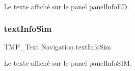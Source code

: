 Le texte affiché sur le panel panel\+Info\+ED. 

\mbox{\label{class_navigation_aefa9a0108a63c721559a2ede11fad997}} 
\subsubsection{\texorpdfstring{text\+Info\+Sim}{textInfoSim}}
{\footnotesize\ttfamily T\+M\+P\+\_\+\+Text Navigation.\+text\+Info\+Sim\hspace{0.3cm}{\ttfamily [private]}}



Le texte affiché sur le panel panel\+Info\+S\+IM. 

